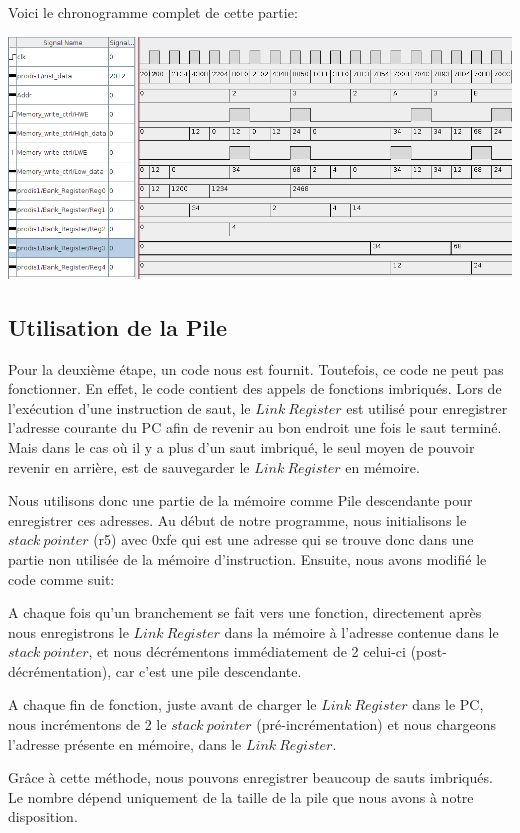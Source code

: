 \documentclass[11pt,a4paper]{article}
\begin{document}
\newpage
Voici le chronogramme complet de cette partie:

\includegraphics[width=15.8cm]{img_chrono3.png}

\subsection{Utilisation de la Pile}

Pour la deuxième étape, un code nous est fournit. Toutefois, ce code ne peut pas fonctionner. En effet, le code contient des appels de fonctions imbriqués. Lors de l'exécution d'une instruction de saut, le $Link\ Register$ est utilisé pour enregistrer l'adresse courante du PC afin de revenir au bon endroit une fois le saut terminé. Mais dans le cas où il y a plus d'un saut imbriqué, le seul moyen de pouvoir revenir en arrière, est de sauvegarder le $Link\ Register$ en mémoire.

Nous utilisons donc une partie de la mémoire comme Pile descendante pour enregistrer ces adresses. Au début de notre programme, nous initialisons le $stack\ pointer$ (r5) avec 0xfe qui est une adresse qui se trouve donc dans une partie non utilisée de la mémoire d'instruction. Ensuite, nous avons modifié le code comme suit:

A chaque fois qu'un branchement se fait vers une fonction, directement après nous enregistrons le $Link\ Register$ dans la mémoire à l'adresse contenue dans le $stack\ pointer$, et nous décrémentons immédiatement de 2 celui-ci (post-décrémentation), car c'est une pile descendante.

A chaque fin de fonction, juste avant de charger le $Link\ Register$ dans le PC, nous incrémentons de 2 le $stack\ pointer$ (pré-incrémentation) et nous chargeons l'adresse présente en mémoire, dans le $Link\ Register$.

Grâce à cette méthode, nous pouvons enregistrer beaucoup de sauts imbriqués. Le nombre dépend uniquement de la taille de la pile que nous avons à notre disposition.
\end{document}
